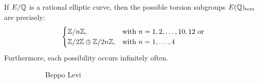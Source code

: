 \begin{frame}[plain]
\begin{thm}
If $E/\mathbb{Q}$ is a rational elliptic curve, then the possible torsion subgroups $E(\mathbb{Q})_{\text{tors}}$ are precisely:
	\[
	\begin{cases}
	\mathbb{Z}/n\mathbb{Z}, & \text{with } n=1,2,\ldots,10,12 \text{ or} \\
	\mathbb{Z}/2\mathbb{Z} \oplus \mathbb{Z}/2n\mathbb{Z}, & \text{with } n=1,\ldots,4
	\end{cases}
	\]
Furthermore, each possibility occurs infinitely often.
\end{thm}
	\begin{figure}[h]
	\centering
	\begin{subfigure}{0.3\textwidth}
	\captionsetup{labelformat=empty}
	\centering
	\caption{Beppo Levi}
	\end{subfigure}
	\begin{subfigure}{0.3\textwidth}
	\captionsetup{labelformat=empty}
	\centering

\end{subfigure}
\end{figure}
\end{frame}

